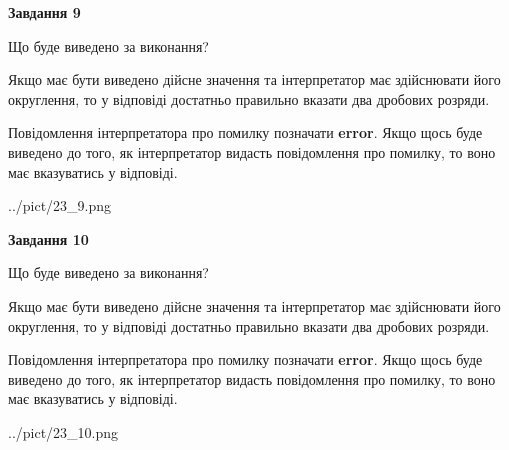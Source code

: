 \documentclass[12pt, ukrainian]{article}
\begin{document}
{\begin {Large}
{\begin {center}\textbf{Завдання 9}\end {center}}\par
Що буде виведено за виконання? \par

Якщо має бути виведено дійсне значення та інтерпретатор має здійснювати його округлення, 
то у відповіді достатньо правильно вказати два дробових розряди.

Повідомлення інтерпретатора про помилку позначати \textbf{error}.
Якщо щось буде виведено до того, як інтерпретатор видасть повідомлення про помилку, 
то воно має вказуватись у відповіді. \par

\begin{center}
	{../pict/23_9.png}
\end{center}
\newpage

{\begin {center}\textbf{Завдання 10}\end {center}}\par
Що буде виведено за виконання? \par

Якщо має бути виведено дійсне значення та інтерпретатор має здійснювати його округлення, 
то у відповіді достатньо правильно вказати два дробових розряди.

Повідомлення інтерпретатора про помилку позначати \textbf{error}.
Якщо щось буде виведено до того, як інтерпретатор видасть повідомлення про помилку, 
то воно має вказуватись у відповіді. \par

\begin{center}
	{../pict/23_10.png}
\end{center}
\newpage

\end {Large}}
\end{document}
